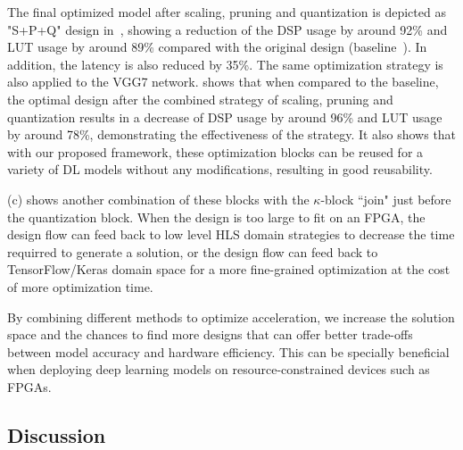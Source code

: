 The final optimized model after scaling, pruning and quantization is depicted as "S+P+Q" design in~, showing a reduction of the DSP usage by around 92\% and LUT usage by around 89\% compared with the original design (baseline~\cite{duarte2018fast}). In addition, the latency is also reduced by 35\%. 
The same optimization strategy is also applied to the VGG7 network.  shows that when compared to the baseline, the optimal design after the combined strategy of scaling, pruning and quantization results in a decrease of DSP usage by around 96\% and LUT usage by around 78\%, demonstrating the effectiveness of the strategy. It also shows that with our proposed framework, these optimization blocks can be reused for a variety of DL models without any modifications, resulting in good reusability.  

(c) shows another combination of these blocks with the $\kappa$-block ``join" just before the quantization block. When the design is too large to fit on an FPGA, the design flow can feed back to low level HLS domain strategies to decrease the time requirred to generate a solution, or the design flow can feed back to TensorFlow/Keras domain space for a more fine-grained optimization at the cost of more optimization time. 

By combining different methods to optimize acceleration, we increase the solution space and the chances to find more designs that can offer  better trade-offs between model accuracy and hardware efficiency. This can be specially beneficial when deploying deep learning models on resource-constrained devices such as FPGAs.
%




\subsection{Discussion}\label{sec:discussion}


